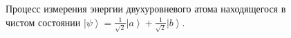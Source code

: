 \begin{figure}
\centering



\caption{Процесс измерения энергии двухуровневого атома находящегося в
чистом состоянии $\left|\psi\right> = 
\frac{1}{\sqrt{2}}\left|a\right> + \frac{1}{\sqrt{2}}\left|b\right>$.}
\label{fig:add:mesure_ex}
\end{figure}
